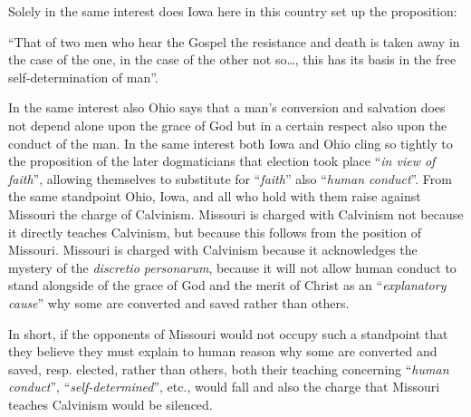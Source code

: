                 Solely in the same interest does Iowa here in this country set up the proposition: \begin{displayquote}{\footnotesize “That of two men who hear the Gospel the resistance and death is taken away in the case of the one, in the case of the other not so…, this has its basis in the free self-determination  of man”.}\end{displayquote}  In the same interest also Ohio says that a man’s conversion and salvation does not depend alone upon the grace of God but in a certain respect also upon the conduct of the man.  In the same interest both Iowa and Ohio cling so tightly to the proposition of the later dogmaticians that election took place “\textit{in view of faith}”, allowing themselves to substitute for “\textit{faith}” also “\textit{human conduct}”.  From the same standpoint Ohio, Iowa, and all who hold with them raise against Missouri the charge of Calvinism.  Missouri is charged with Calvinism not because it directly teaches Calvinism, but because this follows from the position of Missouri.  Missouri is charged with Calvinism because it acknowledges the mystery of the \textit{discretio personarum}, because it will not allow human conduct to stand alongside of the grace of God and the merit of Christ as an “\textit{explanatory cause}” why some are converted and saved rather than others. \par In short, if the opponents of Missouri would not occupy such a standpoint that they believe they must explain to human reason why some are converted and saved, resp. elected, rather than others, both their teaching concerning “\textit{human conduct}”, “\textit{self-determined}”, etc., would fall and also the charge that Missouri teaches Calvinism would be silenced.
